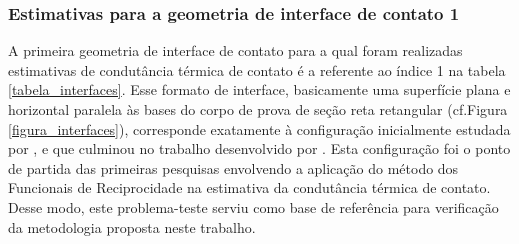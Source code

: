 \newcommand{\graficoctc}[4]{%
	\begin{minipage}[t][7cm][c]{\textwidth}
		\centering
		\begin{tikzpicture}
		\begin{axis}[
		axis lines=left,
		/pgf/number format/1000 sep={.},/pgf/number format/use comma,
		scaled x ticks = false,
		scaled y ticks = false,
		x tick label style={/pgf/number format/fixed},
		y tick label style={/pgf/number format/fixed},
		anchor=east,  
		width=7cm,
		height=6cm,
		label style={font=\footnotesize},
		xlabel = $x$(m),
		ylabel= $...$ (...)]
		\pgfplotstableread{../data/conductance_#2.dat} 
		\teff
		\addplot[color=black, line width=1.5pt] table from \teff;
		\pgfplotstableread{../data/estimativa_ctc_interface_#1_conductance_#2_stdev_00.dat} 
		\teff
		\addplot[only marks, color=blue,mark=o,mark options={mark size=1.5pt}] table from \teff;
		\pgfplotstableread{../data/estimativa_ctc_interface_#1_conductance_#2_stdev_01.dat} 
		\teff
		\addplot[only marks,color=red,mark=square,mark options={mark size=1.5pt}] table from \teff;
		\pgfplotstableread{../data/estimativa_ctc_interface_#1_conductance_#2_stdev_05.dat} 
		\teff
		\addplot[only marks,color=gray,mark=triangle,mark options={mark size=1.5pt}] table from \teff;
		\end{axis}
		\end{tikzpicture}
		\caption*{(#4) Perfil #3}
	\end{minipage}
}%

\subsubsection{Estimativas para a geometria de interface de contato 1}

A primeira geometria de interface de contato para a qual foram realizadas estimativas de condutância térmica de contato é a referente ao índice 1 na tabela \ref{tabela_interfaces}. Esse formato de interface, basicamente uma superfície plana e horizontal paralela às bases do corpo de prova de seção reta retangular (cf.Figura \ref{figura_interfaces}), corresponde exatamente à configuração inicialmente estudada por \cite{reciproc_3}, e que culminou no trabalho desenvolvido por \cite{tese_padilha}. Esta configuração foi o ponto de partida das primeiras pesquisas envolvendo a aplicação do método dos Funcionais de Reciprocidade na estimativa da condutância térmica de contato. Desse modo, este problema-teste serviu como base de referência para verificação da metodologia proposta neste trabalho.

